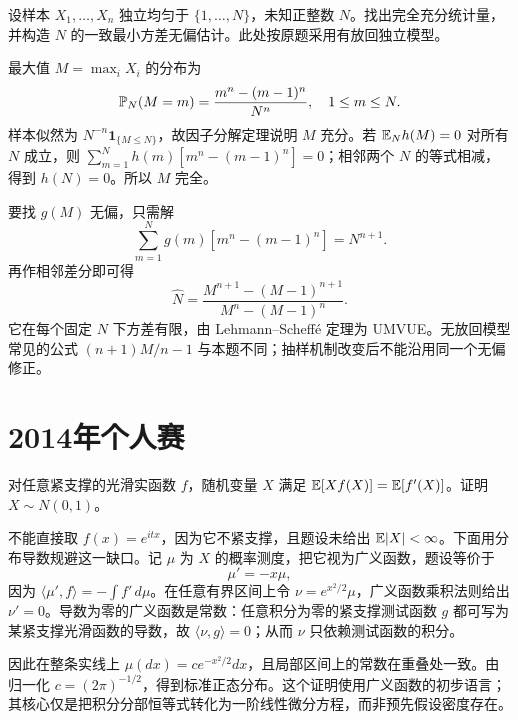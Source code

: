 \begin{example}\label{yau:2013-6}
设样本 $X_1,\ldots,X_n$ 独立均匀于 $\{1,\ldots,N\}$，未知正整数 $N$。找出完全充分统计量，并构造 $N$ 的一致最小方差无偏估计。此处按原题采用有放回独立模型。
\end{example}
\begin{solve}
最大值 $M=\max_iX_i$ 的分布为
\[
\mathbb P_N(M=m)=\frac{m^n-(m-1)^n}{N^n},\quad1\le m\le N.
\]
样本似然为 $N^{-n}\mathbf1_{\{M\le N\}}$，故因子分解定理说明 $M$ 充分。若 $\mathbb E_N h(M)=0$ 对所有 $N$ 成立，则 $\sum_{m=1}^Nh(m)[m^n-(m-1)^n]=0$；相邻两个 $N$ 的等式相减，得到 $h(N)=0$。所以 $M$ 完全。

要找 $g(M)$ 无偏，只需解
\[
\sum_{m=1}^Ng(m)[m^n-(m-1)^n]=N^{n+1}.
\]
再作相邻差分即可得
\[
\widehat N=\frac{M^{n+1}-(M-1)^{n+1}}{M^n-(M-1)^n}.
\]
它在每个固定 $N$ 下方差有限，由 Lehmann--Scheffé 定理为 UMVUE。无放回模型常见的公式 $(n+1)M/n-1$ 与本题不同；抽样机制改变后不能沿用同一个无偏修正。
\end{solve}

\section{2014年个人赛}
\begin{example}[原题1：正态分布的积分恒等式刻画]\label{yau:2014-1}
对任意紧支撑的光滑实函数 $f$，随机变量 $X$ 满足 $\mathbb E[Xf(X)]=\mathbb E[f'(X)]$。证明 $X\sim N(0,1)$。
\end{example}
\begin{solve}
不能直接取 $f(x)=e^{itx}$，因为它不紧支撑，且题设未给出 $\mathbb E|X|<\infty$。下面用分布导数规避这一缺口。记 $\mu$ 为 $X$ 的概率测度，把它视为广义函数，题设等价于
\[
\mu'=-x\mu,
\]
因为 $\langle\mu',f\rangle=-\int f'\,d\mu$。在任意有界区间上令 $\nu=e^{x^2/2}\mu$，广义函数乘积法则给出 $\nu'=0$。导数为零的广义函数是常数：任意积分为零的紧支撑测试函数 $g$ 都可写为某紧支撑光滑函数的导数，故 $\langle\nu,g\rangle=0$；从而 $\nu$ 只依赖测试函数的积分。

因此在整条实线上 $\mu(dx)=c e^{-x^2/2}dx$，且局部区间上的常数在重叠处一致。由归一化 $c=(2\pi)^{-1/2}$，得到标准正态分布。这个证明使用广义函数的初步语言；其核心仅是把积分分部恒等式转化为一阶线性微分方程，而非预先假设密度存在。
\end{solve}

